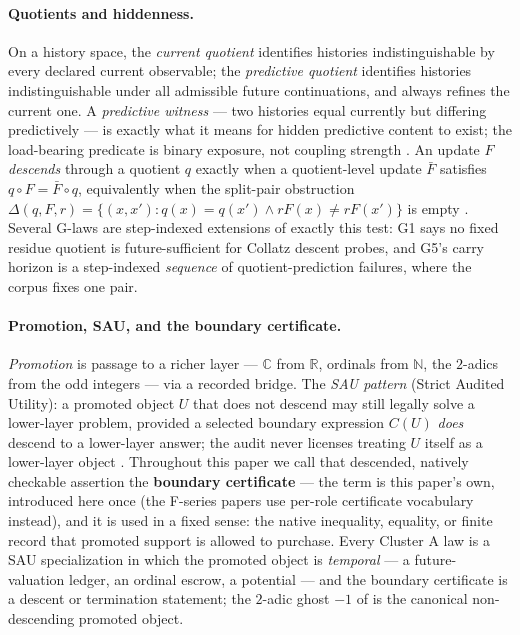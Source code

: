 \documentclass[11pt]{article}
\theoremstyle{definition}
\begin{document}
\paragraph{Quotients and hiddenness.} On a history space, the \emph{current quotient} identifies
histories indistinguishable by every declared current observable; the \emph{predictive quotient}
identifies histories indistinguishable under all admissible future continuations, and always refines
the current one. A \emph{predictive witness} --- two histories equal currently but differing
predictively --- is exactly what it means for hidden predictive content to exist; the load-bearing
predicate is binary exposure, not coupling strength \citep{Tsiokos2026Holonomy,Tsiokos2026Hiddenness}.
An update $F$ \emph{descends} through a quotient $q$ exactly when a quotient-level update $\bar F$
satisfies $q \circ F = \bar F \circ q$, equivalently when the split-pair obstruction
$\Delta(q, F, r) = \{(x, x') : q(x) = q(x') \wedge r F(x) \neq r F(x')\}$ is empty
\citep{Tsiokos2026FoundIV}. Several G-laws are step-indexed extensions of exactly this test: G1 says
no fixed residue quotient is future-sufficient for Collatz descent probes, and G5's carry horizon is
a step-indexed \emph{sequence} of quotient-prediction failures, where the corpus fixes one pair.

\paragraph{Promotion, SAU, and the boundary certificate.} \emph{Promotion} is passage to a richer
layer --- $\mathbb{C}$ from $\mathbb{R}$, ordinals from $\mathbb{N}$, the $2$-adics from the odd
integers --- via a recorded bridge. The \emph{SAU pattern} (Strict Audited Utility): a promoted
object $U$ that does not descend may still legally solve a lower-layer problem, provided a selected
boundary expression $C(U)$ \emph{does} descend to a lower-layer answer; the audit never licenses
treating $U$ itself as a lower-layer object \citep{Tsiokos2026WhyMath}. Throughout this paper we call
that descended, natively checkable assertion the \textbf{boundary certificate} --- the term is this
paper's own, introduced here once (the F-series papers use per-role certificate vocabulary instead),
and it is used in a fixed sense: the native inequality, equality, or finite record that promoted
support is allowed to purchase. Every Cluster A law is a SAU specialization in which the promoted
object is \emph{temporal} --- a future-valuation ledger, an ordinal escrow, a potential --- and the
boundary certificate is a descent or termination statement; the $2$-adic ghost $-1$ of
 is the canonical non-descending promoted object.
\end{document}
